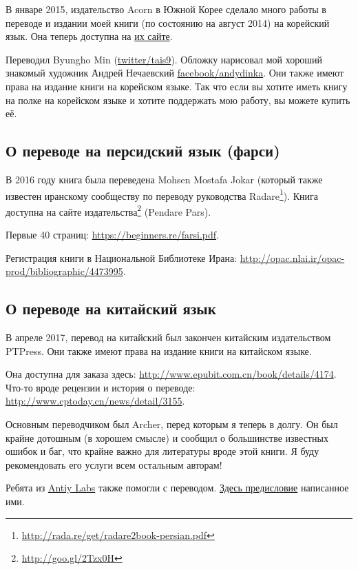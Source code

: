 В январе 2015, издательство Acorn в Южной Корее сделало много работы в переводе 
и издании моей книги (по состоянию на август 2014) на корейский язык.
Она теперь доступна на \href{http://go.yurichev.com/17343}{их сайте}.

Переводил Byungho Min (\href{http://go.yurichev.com/17344}{twitter/tais9}).
Обложку нарисовал мой хороший знакомый художник Андрей Нечаевский
\href{http://go.yurichev.com/17023}{facebook/andydinka}.
Они также имеют права на издание книги на корейском языке.
Так что если вы хотите иметь  книгу на полке на корейском языке и
хотите поддержать мою работу, вы можете купить её.

\subsection*{О переводе на персидский язык (фарси)}

В 2016 году книга была переведена Mohsen Mostafa Jokar (который также известен иранскому сообществу по переводу руководства Radare\footnote{\url{http://rada.re/get/radare2book-persian.pdf}}).
Книга доступна на сайте издательства\footnote{\url{http://goo.gl/2Tzx0H}} (Pendare Pars).

Первые 40 страниц: \url{https://beginners.re/farsi.pdf}.

Регистрация книги в Национальной Библиотеке Ирана: \url{http://opac.nlai.ir/opac-prod/bibliographic/4473995}.

\subsection*{О переводе на китайский язык}

В апреле 2017, перевод на китайский был закончен китайским издательством PTPress. Они также имеют права на издание книги на китайском языке.

Она доступна для заказа здесь: \url{http://www.epubit.com.cn/book/details/4174}. Что-то вроде рецензии и история о переводе: \url{http://www.cptoday.cn/news/detail/3155}.

Основным переводчиком был Archer, перед которым я теперь в долгу.
Он был крайне дотошным (в хорошем смысле) и сообщил о большинстве известных ошибок и баг, что крайне важно для литературы вроде этой книги.
Я буду рекомендовать его услуги всем остальным авторам!

Ребята из \href{http://www.antiy.net/}{Antiy Labs} также помогли с переводом. \href{http://www.epubit.com.cn/book/onlinechapter/51413}{Здесь предисловие} написанное ими.

